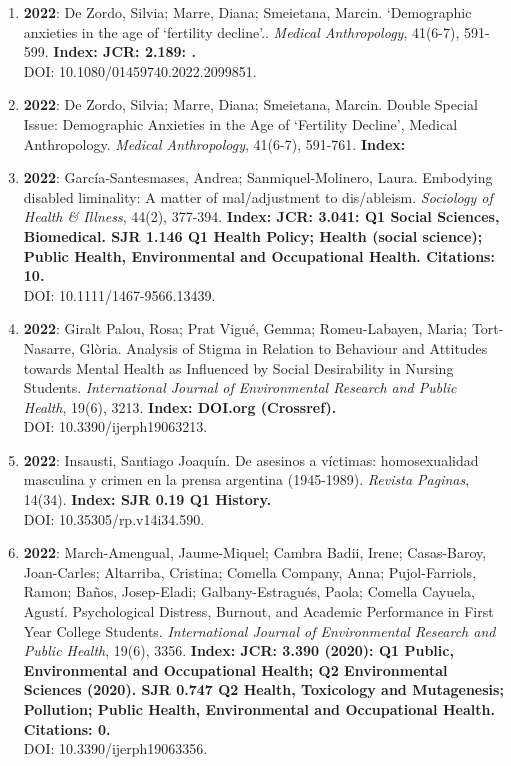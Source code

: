 \begin{enumerate}
\item {\bf 2022}: De Zordo, Silvia; Marre, Diana; Smeietana, Marcin.  ‘Demographic anxieties in the age of ‘fertility decline’.. {\it Medical Anthropology}, 41(6-7), 591-599. {\bf Index: JCR: 2.189: .  } \\ DOI: 10.1080/01459740.2022.2099851. \filbreak
\item {\bf 2022}: De Zordo, Silvia; Marre, Diana; Smeietana, Marcin.  Double Special Issue: Demographic Anxieties in the Age of ‘Fertility Decline’, Medical Anthropology. {\it Medical Anthropology}, 41(6-7), 591-761. {\bf Index: } \filbreak
\item {\bf 2022}: García‐Santesmases, Andrea; Sanmiquel‐Molinero, Laura.  Embodying disabled liminality: A matter of mal/adjustment to dis/ableism. {\it Sociology of Health \& Illness}, 44(2), 377-394. {\bf Index: JCR: 3.041: Q1 Social Sciences, Biomedical.  SJR 1.146 Q1 Health Policy; Health (social science); Public Health, Environmental and Occupational Health. Citations: 10. } \\ DOI: 10.1111/1467-9566.13439. \filbreak
\item {\bf 2022}: Giralt Palou, Rosa; Prat Vigué, Gemma; Romeu-Labayen, Maria; Tort-Nasarre, Glòria.  Analysis of Stigma in Relation to Behaviour and Attitudes towards Mental Health as Influenced by Social Desirability in Nursing Students. {\it International Journal of Environmental Research and Public Health}, 19(6), 3213. {\bf Index: DOI.org (Crossref). } \\ DOI: 10.3390/ijerph19063213. \filbreak
\item {\bf 2022}: Insausti, Santiago Joaquín.  De asesinos a víctimas: homosexualidad masculina y crimen en la prensa argentina (1945-1989). {\it Revista Paginas}, 14(34). {\bf Index: SJR 0.19 Q1 History. } \\ DOI: 10.35305/rp.v14i34.590. \filbreak
\item {\bf 2022}: March-Amengual, Jaume-Miquel; Cambra Badii, Irene; Casas-Baroy, Joan-Carles; Altarriba, Cristina; Comella Company, Anna; Pujol-Farriols, Ramon; Baños, Josep-Eladi; Galbany-Estragués, Paola; Comella Cayuela, Agustí.  Psychological Distress, Burnout, and Academic Performance in First Year College Students. {\it International Journal of Environmental Research and Public Health}, 19(6), 3356. {\bf Index: JCR: 3.390 (2020): Q1 Public, Environmental and Occupational Health; Q2 Environmental Sciences (2020).  SJR 0.747 Q2 Health, Toxicology and Mutagenesis; Pollution; Public Health, Environmental and Occupational Health. Citations: 0. } \\ DOI: 10.3390/ijerph19063356. \filbreak

\end{enumerate}
